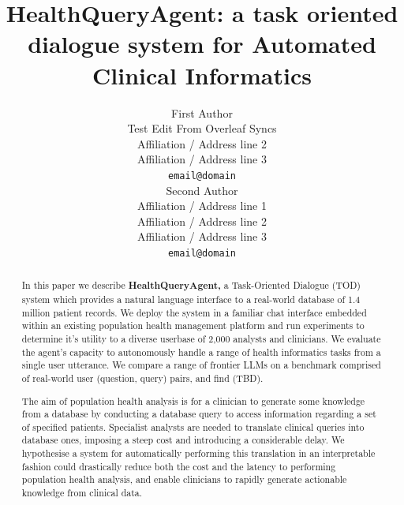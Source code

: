\documentclass[11pt]{article}
\title{HealthQueryAgent: a task oriented dialogue system for Automated Clinical Informatics}
\author{First Author \\
  Test Edit From Overleaf Syncs \\
  Affiliation / Address line 2 \\
  Affiliation / Address line 3 \\
  \texttt{email@domain} \\\And
  Second Author \\
  Affiliation / Address line 1 \\
  Affiliation / Address line 2 \\
  Affiliation / Address line 3 \\
  \texttt{email@domain} \\}
\begin{document}
\maketitle
\begin{abstract}
In this paper we describe \textbf{HealthQueryAgent,} a Task-Oriented Dialogue (TOD) system which provides a natural language interface to a real-world database of 1.4 million patient records. We deploy the system in a familiar chat interface embedded within an existing population health management platform and run experiments to determine it's utility to a diverse userbase of 2,000 analysts and clinicians. We evaluate the agent's capacity to autonomously handle a range of health informatics tasks from a single user utterance. We compare a range of frontier LLMs on a benchmark comprised of real-world user (question, query) pairs, and find (TBD).


The aim of population health analysis is for a clinician to generate some knowledge from a database by conducting a database query to access information regarding a set of specified patients. 
Specialist analysts are needed to translate clinical queries into database ones, imposing a steep cost and introducing a considerable delay. We hypothesise a system for automatically performing this translation in an interpretable fashion could drastically reduce both the cost and the latency to performing population health analysis, and enable clinicians to rapidly generate actionable knowledge from clinical data.

\end{abstract}
\end{document}
